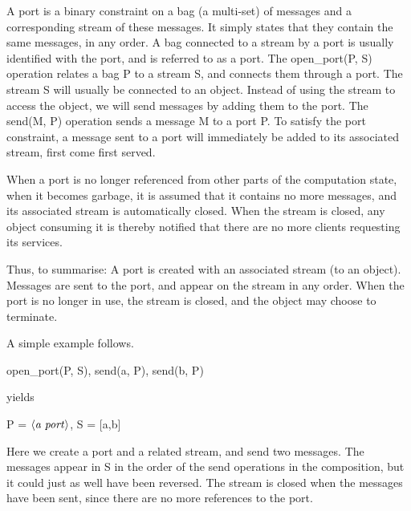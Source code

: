 A port is a binary constraint on a bag (a multi-set) of messages and a
corresponding stream of these messages.  It simply states that they
contain the same messages, in any order.  A bag connected to a stream
by a port is usually identified with the port, and is referred to as a
port.  The {\prog open_port(P, S)} operation relates a bag {\prog P}
to a stream {\prog S}, and connects them through a port.  The stream
{\prog S} will usually be connected to an object.  Instead of using
the stream to access the object, we will send messages by adding them
to the port.  The {\prog send(M, P)} operation sends a message {\prog
M} to a port {\prog P}.  To satisfy the port constraint, a message
sent to a port will immediately be added to its associated stream,
first come first served.

When a port is no longer referenced from other parts of the
computation state, when it becomes garbage, it is assumed that it
contains no more messages, and its associated stream is automatically
closed.  When the stream is closed, any object consuming it is thereby
notified that there are no more clients requesting its services.

Thus, to summarise: A port is created with an associated stream (to an
object).  Messages are sent to the port, and appear on the stream in
any order.  When the port is no longer in use, the stream is closed,
and the object may choose to terminate.

A simple example follows.
%
\begin{progex}
open_port(P, S), send(a, P), send(b, P)
\end{progex}%
%
yields
%
\begin{progex}
P = $\nt{a port}$, S = [a,b]
\end{progex}%
%
Here we create a port and a related stream, and send two messages.  The
messages appear in {\prog S} in the order of the send operations in the
composition, but it could just as well have been reversed.  The stream
is closed when the messages have been sent, since there are no more
references to the port.

